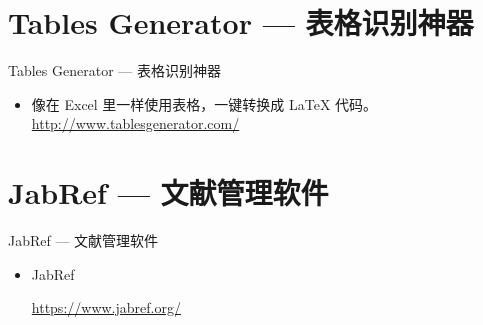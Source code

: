 \documentclass[13pt]{ctexbeamer}
\begin{document}
\section{Tables Generator --- 表格识别神器 }
\begin{frame}{Tables Generator  --- 表格识别神器 }
\begin{itemize}
	\item 	 像在 Excel 里一样使用表格，一键转换成 LaTeX 代码。
	\href{ http://www.tablesgenerator.com/}{ http://www.tablesgenerator.com/}

\end{itemize}


\end{frame}


\section{JabRef --- 文献管理软件}
\begin{frame}{JabRef  --- 文献管理软件}
\begin{itemize}
\item  JabRef

\href{https://www.jabref.org/}{https://www.jabref.org/}
\end{itemize}
\end{frame}
\end{document}

